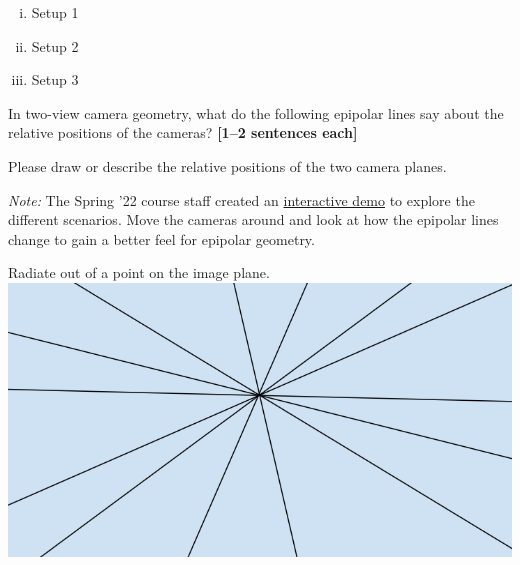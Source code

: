 \documentclass{csci1430}
\begin{document}
\begin{enumerate}[(i)]
    
    \item Setup 1\\
    \begin{answer}[height=7]
    \end{answer}

    \item Setup 2\\
    \begin{answer}[height=7]
    \end{answer}
    
    \item Setup 3\\
    \begin{answer}[height=7]
    \end{answer}
    
\end{enumerate}


\pagebreak 
\begin{question}[points=3,drawbox=false] 
In two-view camera geometry, what do the following epipolar lines say about the relative positions of the cameras? \textbf{[1--2 sentences each]}

Please draw or describe the relative positions of the two camera planes.

\textit{Note:} The Spring '22 course staff created an \href{https://browncsci1430.github.io/resources/stereo_camera_visualization_demo/}{interactive demo} to explore the different scenarios. Move the cameras around and look at how the epipolar lines change to gain a better feel for epipolar geometry.
\end{question}

\begin{subquestion}[points=1]
Radiate out of a point on the image plane.\\
\includegraphics[width = 0.5\linewidth]{images/epipolarlines-a.PNG}
\end{subquestion}

\begin{answer}[height=12]
\end{answer}
\end{document}
